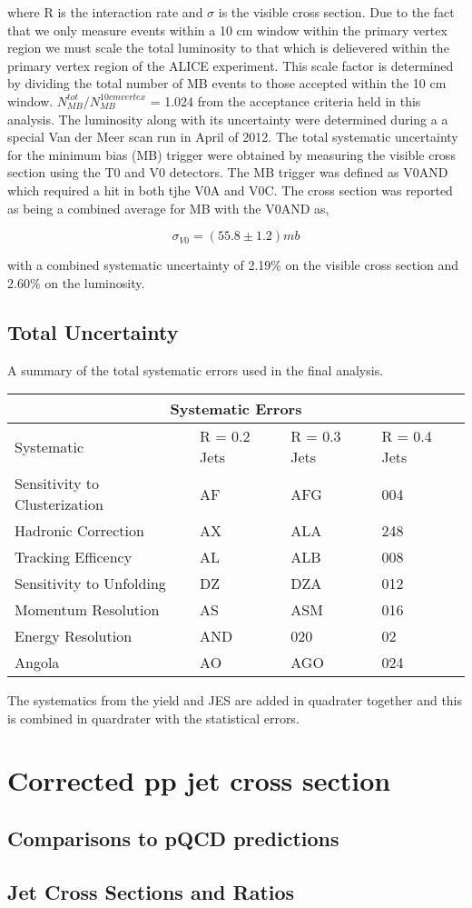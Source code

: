 \noindent
where R is the interaction rate and $\sigma$ is the visible cross section.  Due to the fact that we only measure events within a 10 cm window within the primary vertex region we must scale the total luminosity to that which is delievered within the primary vertex region of the ALICE experiment.  This scale factor is determined by dividing the total number of MB events to those accepted within the 10 cm window.  $N^{tot}_{MB} / N^{10 cm vertex}_{MB}$ = 1.024 from the acceptance criteria held in this analysis.
The luminosity along with its uncertainty were determined during a a special Van der Meer scan run in April of 2012\cite{ALICE-PUBLIC-2017-002}.  The total systematic uncertainty for the minimum bias (MB) trigger were obtained by measuring the visible cross section using the T0 and V0 detectors.  The MB trigger was defined as V0AND which required a hit in both tjhe V0A and V0C.  The cross section was reported as being a combined average for MB with the V0AND as, 

\begin{equation}
\sigma_{V0} = (55.8 \pm 1.2) mb
\label{eq:xlumdef}
\end{equation}

\noindent
with a combined systematic uncertainty of 2.19\% on the visible cross section and 2.60\% on the luminosity. 


\subsection{Total Uncertainty}

A summary of the total systematic errors used in the final analysis.

\begin{tabular}{ |p{5cm}||p{3cm}|p{3cm}|p{3cm}|  }
 \hline
 \multicolumn{4}{|c|}{Systematic Errors} \\
 \hline
 Systematic &R = 0.2 Jets & R = 0.3 Jets& R = 0.4 Jets\\
 \hline
Sensitivity to Clusterization   & AF    &AFG&   004\\
Hadronic Correction&   AX  & ALA   &248\\
Tracking Efficency &AL & ALB&  008\\
Sensitivity to Unfolding&DZ & DZA&  012\\
Momentum Resolution&   AS  & ASM&016\\
Energy Resolution& AND   &020 & 02\\
 Angola& AO  & AGO&024\\
 \hline

\end{tabular}
\noindent

The systematics from the yield and JES are added in quadrater together and this is combined in quardrater with the statistical errors.

\section{Corrected pp jet cross section}


\subsection{Comparisons to pQCD predictions}

\subsection{Jet Cross Sections and Ratios}



